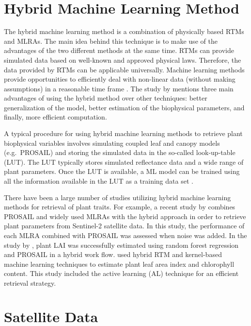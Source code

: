 \documentclass[a4paper, twoside]{templates/ociamthesis}
\begin{document}
\hypertarget{hml}{%
\chapter{Hybrid Machine Learning Method}\label{hml}}

The hybrid machine learning method is a combination of physically based RTMs and MLRAs. The main idea behind this technique is to make use of the advantages of the two different methods at the same time. RTMs can provide simulated data based on well-known and approved physical laws. Therefore, the data provided by RTMs can be applicable universally. Machine learning methods provide opportunities to efficiently deal with non-linear data (without making assumptions) in a reasonable time frame \citep{abdelbaki2021comparison, de2020quantifying, berger2021survey, ke2016estimating}. The study by \citet{fernandez2021hybrid} mentions three main advantages of using the hybrid method over other techniques: better generalization of the model, better estimation of the biophysical parameters, and finally, more efficient computation.

A typical procedure for using hybrid machine learning methods to retrieve plant biophysical variables involves simulating coupled leaf and canopy models (e.g.~PROSAIL) and storing the simulated data in the so-called look-up-table (LUT). The LUT typically stores simulated reflectance data and a wide range of plant parameters. Once the LUT is available, a ML model can be trained using all the information available in the LUT as a training data set \citep{verrelst2019quantifying}.

There have been a large number of studies utilizing hybrid machine learning methods for retrieval of plant traits. For example, a recent study by \citet{cesar2021exploring} combines PROSAIL and widely used MLRAs with the hybrid approach in order to retrieve plant parameters from Sentinel-2 satellite data. In this study, the performance of each MLRA combined with PROSAIL was assessed when noise was added. In the study by \citet{wei2017estimation}, plant LAI was successfully estimated using random forest regression and PROSAIL in a hybrid work flow. \citet{verrelst2016active} used hybrid RTM and kernel-based machine learning techniques to estimate plant leaf area index and chlorophyll content. This study included the active learning (AL) technique for an efficient retrieval strategy.

\hypertarget{satellite-data}{%
\chapter{Satellite Data}\label{satellite-data}}
\end{document}
